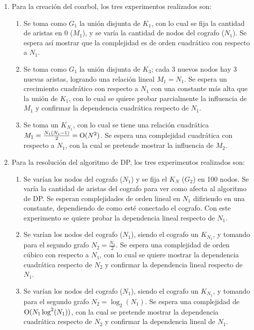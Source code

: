 \begin{enumerate}
    \item Para la creación del coarbol, los tres experimentos realizados son:
    \begin{enumerate}
        \item \label{ex3:coarbol_union_k1} Se toma como $G_1$ la unión
        disjunta de $K_1$, con lo cual se fija la cantidad de aristas en $0$
        ($M_1$), y se varía la cantidad de nodos del cografo ($N_1$). Se
        espera así mostrar que la complejidad es de orden cuadrático con
        respecto a $N_1$.
        \item \label{ex3:coarbol_union_k3} Se toma como $G_1$ la unión
        disjunta de $K_3$; cada 3 nuevos nodos hay 3 nuevas aristas, logrando
        una relación lineal $M_1 = N_1$. Se espera un crecimiento cuadrático
        con respecto a $N_1$ con una constante más alta que la unión de $K_1$,
        con lo cual se quiere probar parcialmente la influencia de $M_1$ y
        confirmar la dependencia cuadrática respecto de $N_1$.
        \item \label{ex3:coarbol_kn} Se toma un $K_{N_1}$, con lo cual se
        tiene una relación cuadrática $M_1 = \frac{N_1(N_1 - 1)}{2} =
        \operatorname{O}(N^2)$. Se espera una complejidad cuadrática con respecto a $N_1$,
        con la cual se pretende mostrar la influencia de $M_2$.
    \end{enumerate}

    \item Para la resolución del algoritmo de DP, los tres experimentos
    realizados son:
    \begin{enumerate}
        \item \label{ex3:dp_n2_const} Se varían los nodos del cografo ($N_1$) y se
        fija el $K_N$ ($G_2$) en 100 nodos. Se varía la cantidad de aristas
        del cografo para ver como afecta al algoritmo de DP. Se esperan
        complejidades de orden lineal en $N_1$ difiriendo en una constante,
        dependiendo de como esté conectado el cografo. Con este experimento se
        quiere probar la dependencia lineal respecto de $N_1$.
        \item \label{ex3:dp_n2_lineal} Se varían los nodos del cografo
        ($N_1$), siendo el cografo un $K_ {N_1}$, y tomando para el segundo
        grafo $N_2 = \frac{N_1}{2}$. Se espera una complejidad de orden cúbico
        con respecto a $N_1$, con lo cual se quiere mostrar la dependencia
        cuadrática respecto de $N_2$ y confirmar la dependencia lineal
        respecto de $N_1$.
        \item \label{ex3:dp_n2_log} Se varían los nodos del cografo ($N_1$),
        siendo el cografo un $K_ {N_1}$, y tomando para el segundo grafo $N_2
        = \log_2(N_1)$. Se espera una complejidad de $\operatorname{O}(N_1 \log^2(N_1))$,
        con la cual se pretende mostrar la dependencia cuadrática respecto de
        $N_2$ y confirmar la dependencia lineal de $N_1$.
    \end{enumerate}
\end{enumerate}

